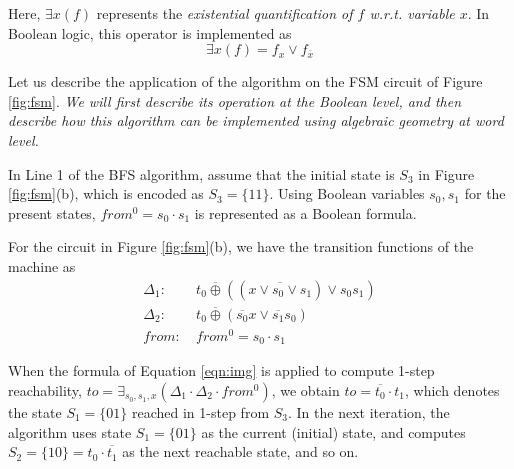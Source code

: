 Here, $\exists x (f)$ represents the {\it existential quantification
  of $f$ {\it w.r.t.} variable $x$}. In Boolean logic, this operator is implemented as
  $$\exists x (f) = f_x\lor f_{\overline{x}}$$





Let us describe the application of the algorithm on the  FSM circuit
of Figure \ref{fig:fsm}. {\it We will first describe its operation at the
Boolean level, and then describe how this algorithm can be implemented
using algebraic geometry at word level.} 

\begin{figure}[bp]
\end{figure}

In Line 1 of the BFS algorithm, assume that the initial state
is $S_3$ in Figure \ref{fig:fsm}(b), which is encoded as 
$S_3 = \{11\}$. Using Boolean variables $s_0, s_1$ for the present
states, $from^0 = s_0\cdot s_1$ is represented as a Boolean formula. 



\begin{Example}
For the circuit in Figure \ref{fig:fsm}(b), we have the transition
functions of the machine as
\begin{align*}
\Delta_1: & ~t_0 \overline{\oplus} ((\overline{x \vee s_0 \vee s_1}) \vee s_0 s_1)\\
\Delta_2: & ~t_0 \overline{\oplus} (\overline{s_0}x \vee \overline{s_1}s_0)\\
from:     & ~from^0 = s_0\cdot s_1
\end{align*}

When the formula of Equation \ref{eqn:img} is applied to compute 1-step
reachability, $to = \exists _{s_0, s_1, x} (\Delta_1 \cdot \Delta_2
\cdot from^0)$, we obtain $to = \overline{t_0}\cdot t_1$, which denotes
the state $S_1 = \{01\}$ reached in 1-step from $S_3$.
In the next iteration, the algorithm uses state $S_1 = \{01\}$ as the
current (initial) state, and computes $S_2 = \{10\} = t_0\cdot
\overline{t_1}$ as the next reachable state, and so on. 
\end{Example}

